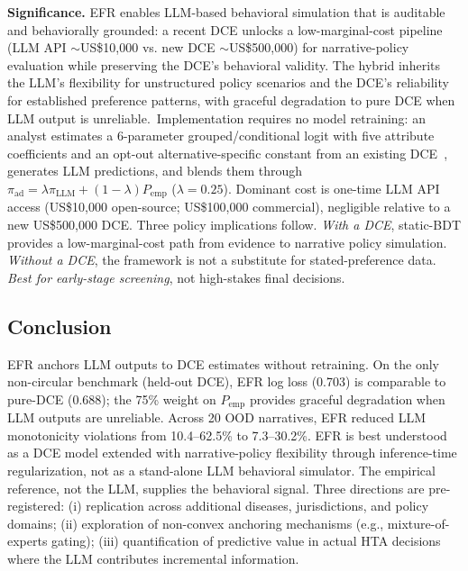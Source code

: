 \documentclass[11pt]{article}
\begin{document}
\textbf{Significance.} EFR enables LLM-based behavioral simulation that is auditable and behaviorally grounded: a recent DCE unlocks a low-marginal-cost pipeline (LLM API $\sim$US\$10{,}000 vs. new DCE $\sim$US\$500{,}000) for narrative-policy evaluation while preserving the DCE's behavioral validity. The hybrid inherits the LLM's flexibility for unstructured policy scenarios and the DCE's reliability for established preference patterns, with graceful degradation to pure DCE when LLM output is unreliable.\ Implementation requires no model retraining: an analyst estimates a 6-parameter grouped/conditional logit with five attribute coefficients and an opt-out alternative-specific constant from an existing DCE~\citep{Johnson2013DCE,Hauber2016DCE}, generates LLM predictions, and blends them through $\pi_{\mathrm{ad}} = \lambda \pi_{\mathrm{LLM}} + (1-\lambda) P_{\mathrm{emp}}$ ($\lambda = 0.25$). Dominant cost is one-time LLM API access (US\$10,000 open-source; US\$100,000 commercial), negligible relative to a new US\$500,000 DCE. Three policy implications follow. \emph{With a DCE}, static-BDT provides a low-marginal-cost path from evidence to narrative policy simulation. \emph{Without a DCE}, the framework is not a substitute for stated-preference data. \emph{Best for early-stage screening}, not high-stakes final decisions.

\subsection{Conclusion}\nopagebreak\label{sec:conclusion}

EFR anchors LLM outputs to DCE estimates without retraining. On the only non-circular benchmark (held-out DCE), EFR log loss (0.703) is comparable to pure-DCE (0.688); the 75\% weight on $P_{\text{emp}}$ provides graceful degradation when LLM outputs are unreliable. Across 20 OOD narratives, EFR reduced LLM monotonicity violations from 10.4--62.5\% to 7.3--30.2\%. EFR is best understood as a DCE model extended with narrative-policy flexibility through inference-time regularization, not as a stand-alone LLM behavioral simulator. The empirical reference, not the LLM, supplies the behavioral signal. Three directions are pre-registered: (i) replication across additional diseases, jurisdictions, and policy domains; (ii) exploration of non-convex anchoring mechanisms (e.g., mixture-of-experts gating); (iii) quantification of predictive value in actual HTA decisions where the LLM contributes incremental information.
\end{document}
